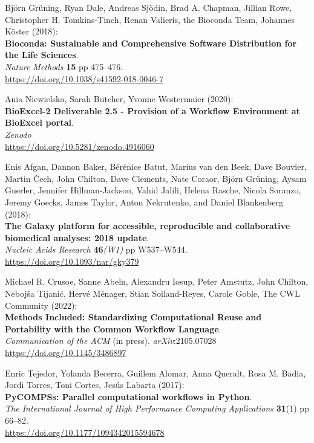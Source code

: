 \begin{thebibliography}{9}
Björn Grüning, Ryan Dale, Andreas Sjödin, Brad A. Chapman,
Jillian Rowe, Christopher H. Tomkins-Tinch, Renan Valieris, the Bioconda
Team, Johannes Köster (2018):\\
\textbf{Bioconda: Sustainable and Comprehensive Software Distribution
for the Life Sciences}.\\
\emph{Nature Methods} \textbf{15} pp 475--476.\\
\url{https://doi.org/10.1038/s41592-018-0046-7}

Ania Niewielska, Sarah Butcher, Yvonne Westermaier (2020):\\
\textbf{BioExcel-2 Deliverable 2.5 - Provision of a Workflow Environment
at BioExcel portal}.\\
\emph{Zenodo}\\
\url{https://doi.org/10.5281/zenodo.4916060}

Enis Afgan, Dannon Baker, Bérénice Batut, Marius van den Beek,
Dave Bouvier, Martin Čech, John Chilton, Dave Clements, Nate Coraor,
Björn Grüning, Aysam Guerler, Jennifer Hillman-Jackson, Vahid Jalili,
Helena Rasche, Nicola Soranzo, Jeremy Goecks, James Taylor, Anton
Nekrutenko, and Daniel Blankenberg (2018):\\
\textbf{The Galaxy platform for accessible, reproducible and
collaborative biomedical analyses: 2018 update}.\\
\emph{Nucleic Acids Research} \textbf{46}\emph{(W1)} pp W537--W544.\\
\url{https://doi.org/10.1093/nar/gky379}

Michael R. Crusoe, Sanne Abeln, Alexandru Iosup, Peter Amstutz,
John Chilton, Nebojša Tijanić, Hervé Ménager, Stian Soiland-Reyes,
Carole Goble, The CWL Community (2022):\\
\textbf{Methods Included: Standardizing Computational Reuse and
Portability with the Common Workflow Language}.\\
\emph{Communication of the ACM} (in press). \emph{arXiv}:2105.07028\\
\url{https://doi.org/10.1145/3486897}

Enric Tejedor, Yolanda Becerra, Guillem Alomar, Anna Queralt,
Rosa M. Badia, Jordi Torres, Toni Cortes, Jesús Labarta (2017):\\
\textbf{PyCOMPSs: Parallel computational workflows in Python}.\\
\emph{The
International Journal of High Performance Computing Applications}
\textbf{31}(1) pp 66--82.\\
\url{https://doi.org/10.1177/1094342015594678}


\end{thebibliography}
